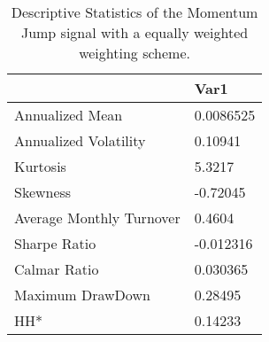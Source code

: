 \begin{table}[H]
\centering
\begin{tabular}{ll}
& Var1 \\ 
\hline 
Annualized Mean & 0.0086525 \\ 
Annualized Volatility & 0.10941 \\ 
Kurtosis & 5.3217 \\ 
Skewness & -0.72045 \\ 
Average Monthly Turnover & 0.4604 \\ 
Sharpe Ratio & -0.012316 \\ 
Calmar Ratio & 0.030365 \\ 
Maximum DrawDown & 0.28495 \\ 
HH* & 0.14233 \\ 
\hline
\end{tabular}
\caption{Descriptive Statistics of the Momentum Jump signal with a equally weighted weighting scheme.}
\label{MOMJUMPEW}
\end{table}